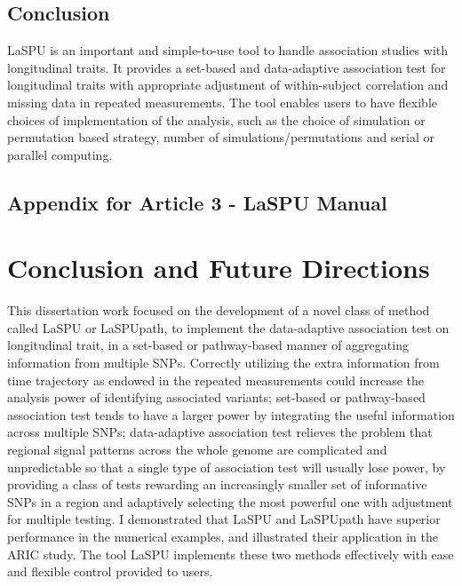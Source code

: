 \documentclass[12pt]{article}
\begin{document}
\subsection{Conclusion}
LaSPU is an important and simple-to-use tool to handle association studies with longitudinal traits. It provides a set-based and data-adaptive association test for longitudinal traits with appropriate adjustment of within-subject correlation and missing data in repeated measurements. The tool enables users to have flexible choices of implementation of the analysis, such as the choice of simulation or permutation based strategy, number of simulations/permutations and serial or parallel computing.  

\subsection{Appendix for Article 3 - LaSPU Manual}


\section{Conclusion and Future Directions}
\pagebreak
This dissertation work focused on the development of a novel class of method called LaSPU or LaSPUpath, to implement the data-adaptive association test on longitudinal trait, in a set-based or pathway-based manner of aggregating information from multiple SNPs. Correctly utilizing the extra information from time trajectory as endowed in the repeated measurements could increase the analysis power of identifying associated variants; set-based or pathway-based association test tends to have a larger power by integrating the useful information across multiple SNPs; data-adaptive association test relieves the problem that regional signal patterns across the whole genome are complicated and unpredictable so that a single type of association test will usually lose power, by providing a class of tests rewarding an increasingly smaller set of informative SNPs in a region and adaptively selecting the most powerful one with adjustment for multiple testing. I demonstrated that LaSPU and LaSPUpath have superior performance in the numerical examples, and illustrated their application in the ARIC study. The tool LaSPU implements these two methods effectively with ease and flexible control provided to users. 
\end{document}
